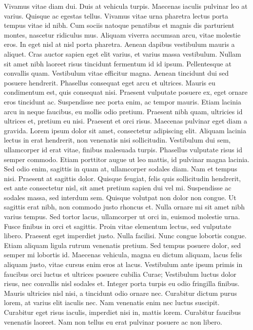 \documentclass[a4paper,11pt,twoside]{book}
\begin{document}
Vivamus vitae diam dui. Duis at vehicula turpis. Maecenas iaculis pulvinar leo at varius. Quisque ac egestas tellus. Vivamus vitae urna pharetra lectus porta tempus vitae id nibh. Cum sociis natoque penatibus et magnis dis parturient montes, nascetur ridiculus mus. Aliquam viverra accumsan arcu, vitae molestie eros. In eget nisl at nisl porta pharetra. Aenean dapibus vestibulum mauris a aliquet.
Cras auctor sapien eget elit varius, et varius massa vestibulum. Nullam sit amet nibh laoreet risus tincidunt fermentum id id ipsum. Pellentesque at convallis quam. Vestibulum vitae efficitur magna. Aenean tincidunt dui sed posuere hendrerit. Phasellus consequat eget arcu et ultrices. Mauris eu condimentum est, quis consequat nisi. Praesent vulputate posuere ex, eget ornare eros tincidunt ac. Suspendisse nec porta enim, ac tempor mauris. Etiam lacinia arcu in neque faucibus, eu mollis odio pretium. Praesent nibh quam, ultricies id ultrices et, pretium eu nisi. Praesent et orci risus. Maecenas pulvinar eget diam a gravida. Lorem ipsum dolor sit amet, consectetur adipiscing elit. Aliquam lacinia lectus in erat hendrerit, non venenatis nisi sollicitudin. Vestibulum dui sem, ullamcorper id erat vitae, finibus malesuada turpis.
Phasellus vulputate risus id semper commodo. Etiam porttitor augue ut leo mattis, id pulvinar magna lacinia. Sed odio enim, sagittis in quam at, ullamcorper sodales diam. Nam et tempus nisi. Praesent at sagittis dolor. Quisque feugiat, felis quis sollicitudin hendrerit, est ante consectetur nisl, sit amet pretium sapien dui vel mi. Suspendisse ac sodales massa, sed interdum sem. Quisque volutpat non dolor non congue.
Ut sagittis erat nibh, non commodo justo rhoncus et. Nulla ornare mi sit amet nibh varius tempus. Sed tortor lacus, ullamcorper ut orci in, euismod molestie urna. Fusce finibus in orci et sagittis. Proin vitae elementum lectus, sed vulputate libero. Praesent eget imperdiet justo. Nulla facilisi. Nunc congue lobortis congue. Etiam aliquam ligula rutrum venenatis pretium. Sed tempus posuere dolor, sed semper mi lobortis id.
Maecenas vehicula, magna eu dictum aliquam, lacus felis aliquam justo, vitae cursus enim eros at lacus. Vestibulum ante ipsum primis in faucibus orci luctus et ultrices posuere cubilia Curae; Vestibulum luctus dolor risus, nec convallis nisl sodales et. Integer porta turpis eu odio fringilla finibus. Mauris ultricies nisl nisi, a tincidunt odio ornare nec. Curabitur dictum purus lorem, at varius elit iaculis nec. Nam venenatis enim nec luctus suscipit. Curabitur eget risus iaculis, imperdiet nisi in, mattis lorem. Curabitur faucibus venenatis laoreet. Nam non tellus eu erat pulvinar posuere ac non libero.
\end{document}
